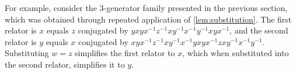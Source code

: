 For example, consider the 3-generator family presented in the previous section, which was obtained through repeated application of \cref{lem:substitution}. The first relator is $x$ equals $z$ conjugated by  $yxyx^{-1}z^{-1}xy^{-1}x^{-1}y^{-1}xyx^{-1}$, and the second relator is $y$ equals $x$ conjugated by $xyx^{-1}z^{-1}xy^{-1}x^{-1}yxyx^{-1}zxy^{-1}x^{-1}y^{-1}$. Substituting $w=z$ simplifies the first relator to $x$, which when substituted into the second relator, simplifies it to $y$. 





